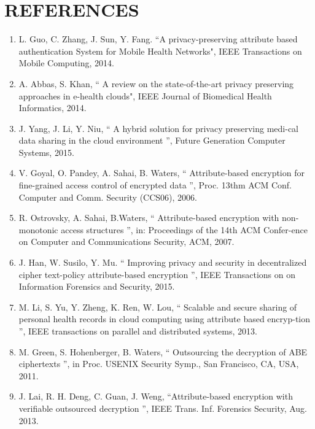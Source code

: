 \documentclass[oneside,a4paper,12pt]{report}
\begin{document}
{%
\chapter{REFERENCES}
\begin{enumerate}
\item L. Guo, C. Zhang, J. Sun, Y. Fang. “A privacy-preserving attribute based authentication System for Mobile Health Networks", IEEE Transactions on Mobile Computing, 2014.

\item A. Abbas, S. Khan, “ A review on the state-of-the-art privacy preserving approaches in e-health clouds", IEEE Journal of Biomedical Health Informatics, 2014.

\item J. Yang, J. Li, Y. Niu, “ A hybrid solution for privacy preserving medi-cal data sharing in the cloud environment ”, Future Generation Computer Systems, 2015.

\item V. Goyal, O. Pandey, A. Sahai, B. Waters, “ Attribute-based encryption for fine-grained access control of encrypted data ”, Proc. 13thm ACM Conf. Computer and Comm. Security (CCS06), 2006.

\item R. Ostrovsky, A. Sahai, B.Waters, “ Attribute-based encryption with non-monotonic access structures ”, in: Proceedings of the 14th ACM Confer-ence on Computer and Communications Security, ACM, 2007.

\item J. Han, W. Susilo, Y. Mu. “ Improving privacy and security in decentralized cipher text-policy attribute-based encryption ”, IEEE Transactions on on Information Forensics and Security, 2015.

\item M. Li, S. Yu, Y. Zheng, K. Ren, W. Lou, “ Scalable and secure sharing of personal health records in cloud computing using attribute based encryp-tion ”, IEEE transactions on parallel and distributed systems, 2013.

\item M. Green, S. Hohenberger, B. Waters, “ Outsourcing the decryption of ABE ciphertexts ”, in Proc. USENIX Security Symp., San Francisco, CA, USA, 2011.

\item J. Lai, R. H. Deng, C. Guan, J. Weng, “Attribute-based encryption with verifiable outsourced decryption ”, IEEE Trans. Inf. Forensics Security, Aug. 2013.


\end{enumerate}}
\end{document}
